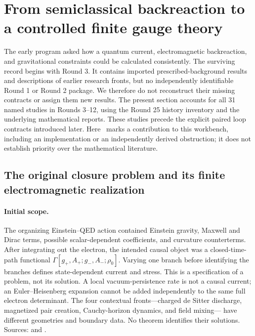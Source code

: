 \section{From semiclassical backreaction to a controlled finite gauge theory}
\label{early:section}

The early program asked how a quantum current, electromagnetic backreaction,
and gravitational constraints could be calculated consistently.  The surviving
record begins with Round 3.  It contains imported prescribed-background results
and descriptions of earlier research fronts, but no independently identifiable
Round 1 or Round 2 package.  We therefore do not reconstruct their missing
contracts or assign them new results.  The present section accounts for all
31 named studies in Rounds 3--12, using the Round 25 history inventory and the
underlying mathematical reports.  These studies precede the explicit paired
loop contracts introduced later.  Here \workstar\ marks a contribution to this
workbench, including an implementation or an independently derived obstruction;
it does not establish priority over the mathematical literature.

\subsection{The original closure problem and its finite electromagnetic realization}
\label{early:qed}

\paragraph{Initial scope.}
The organizing Einstein--QED action contained Einstein gravity, Maxwell and
Dirac terms, possible scalar-dependent coefficients, and curvature counterterms.
After integrating out the electron, the intended causal object was a
closed-time-path functional
\(\Gamma[g_+,A_+;g_-,A_-;\rho_0]\).  Varying one branch before identifying the
branches defines state-dependent current and stress.  This is a specification
of a problem, not its solution.  A local vacuum-persistence rate is not a causal
current; an Euler--Heisenberg expansion cannot be added independently to the
same full electron determinant.  The four contextual fronts---charged de Sitter
discharge, magnetized pair creation, Cauchy-horizon dynamics, and field mixing---
have different geometries and boundary data.  No theorem identifies their
solutions.  Sources: 
and .

